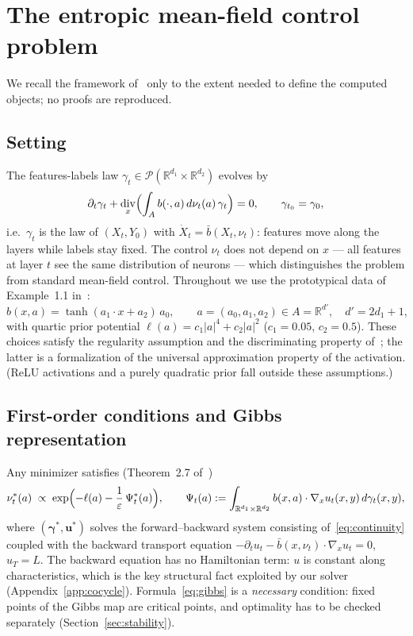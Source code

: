 \documentclass[11pt,leqno]{amsart}
\newcommand{\R}{\mathbb{R}}
\newcommand{\cP}{\mathcal{P}}
\newcommand{\bgamma}{\boldsymbol{\gamma}}
\newcommand{\eps}{\varepsilon}
\newcommand{\dd}{\,d}
\DeclareMathOperator{\divg}{div}
\DeclareMathOperator{\Tanh}{tanh}
\numberwithin{equation}{section}
\theoremstyle{definition}
\begin{document}
\section{The entropic mean-field control problem}
\label{sec:framework}

We recall the framework of~\cite{DaudinDelarue2025} only to the extent
needed to define the computed objects; no proofs are reproduced.

\subsection{Setting}
The features-labels law $\gamma_t\in\cP(\R^{d_1}\times\R^{d_2})$ evolves by
\begin{equation}
\label{eq:continuity}
\partial_t\gamma_t+\divg_x\Bigl(\int_A b(\cdot,a)\dd\nu_t(a)\,\gamma_t\Bigr)=0,
\qquad \gamma_{t_0}=\gamma_0 ,
\end{equation}
i.e.\ $\gamma_t$ is the law of $(X_t,Y_0)$ with
$\dot X_t=\bar b(X_t,\nu_t)$: features move along the layers while labels
stay fixed.  The control $\nu_t$ does not depend on $x$ --- all features at
layer $t$ see the same distribution of neurons --- which distinguishes the
problem from standard mean-field control.  Throughout we use the
prototypical data of Example~1.1 in~\cite{DaudinDelarue2025}:
\begin{equation}
\label{eq:prototype}
b(x,a)=\Tanh(a_1\!\cdot\!x+a_2)\,a_0,
\qquad a=(a_0,a_1,a_2)\in A=\R^{d'},\quad d'=2d_1+1,
\end{equation}
with quartic prior potential $\ell(a)=c_1|a|^4+c_2|a|^2$ ($c_1=0.05$,
$c_2=0.5$).  These choices satisfy the regularity assumption and the
discriminating property of~\cite{DaudinDelarue2025}; the latter is a
formalization of the universal approximation property of the activation.
(ReLU activations and a purely quadratic prior fall outside these
assumptions.)

\subsection{First-order conditions and Gibbs representation}
Any minimizer satisfies (Theorem~2.7 of~\cite{DaudinDelarue2025})
\begin{equation}
\label{eq:gibbs}
\nu^*_t(a)\;\propto\;\exp\Bigl(-\ell(a)-\frac1\eps\,\Psi^*_t(a)\Bigr),
\qquad
\Psi_t(a):=\int_{\R^{d_1}\times\R^{d_2}} b(x,a)\cdot\nabla_x u_t(x,y)
\dd\gamma_t(x,y),
\end{equation}
where $(\bgamma^*,\boldsymbol u^*)$ solves the forward--backward system
consisting of~\eqref{eq:continuity} coupled with the backward transport
equation $-\partial_t u_t-\bar b(x,\nu_t)\cdot\nabla_x u_t=0$, $u_T=L$.
The backward equation has no Hamiltonian term: $u$ is constant along
characteristics, which is the key structural fact exploited by our solver
(Appendix~\ref{app:cocycle}).  Formula~\eqref{eq:gibbs} is a
\emph{necessary} condition: fixed points of the Gibbs map are critical
points, and optimality has to be checked separately
(Section~\ref{sec:stability}).
\end{document}
